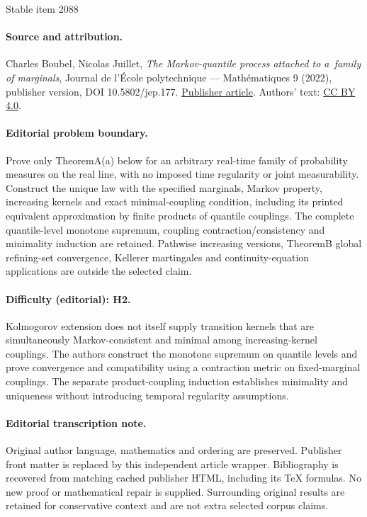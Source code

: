 \documentclass[11pt]{article}
\theoremstyle{plain}
\theoremstyle{definition}
\begin{document}
\begin{center}{\Large Stable item 2088}\end{center}
\paragraph{Source and attribution.}
Charles Boubel, Nicolas Juillet, \emph{The Markov-quantile process attached to a family of marginals}, Journal de l’École polytechnique — Mathématiques 9 (2022), publisher version, DOI 10.5802/jep.177. \href{https://jep.centre-mersenne.org/articles/10.5802/jep.177/}{Publisher article}. Authors' text: \href{https://creativecommons.org/licenses/by/4.0/}{CC BY 4.0}.
\paragraph{Editorial problem boundary.}
Prove only TheoremA(a) below for an arbitrary real-time family of probability measures on the real line, with no imposed time regularity or joint measurability. Construct the unique law with the specified marginals, Markov property, increasing kernels and exact minimal-coupling condition, including its printed equivalent approximation by finite products of quantile couplings. The complete quantile-level monotone supremum, coupling contraction/consistency and minimality induction are retained. Pathwise increasing versions, TheoremB global refining-set convergence, Kellerer martingales and continuity-equation applications are outside the selected claim.
\paragraph{Difficulty (editorial): H2.}
Kolmogorov extension does not itself supply transition kernels that are simultaneously Markov-consistent and minimal among increasing-kernel couplings. The authors construct the monotone supremum on quantile levels and prove convergence and compatibility using a contraction metric on fixed-marginal couplings. The separate product-coupling induction establishes minimality and uniqueness without introducing temporal regularity assumptions.
\paragraph{Editorial transcription note.}
Original author language, mathematics and ordering are preserved. Publisher front matter is replaced by this independent article wrapper. Bibliography is recovered from matching cached publisher HTML, including its TeX formulas. No new proof or mathematical repair is supplied. Surrounding original results are retained for conservative context and are not extra selected corpus claims.
\clearpage
\end{document}
